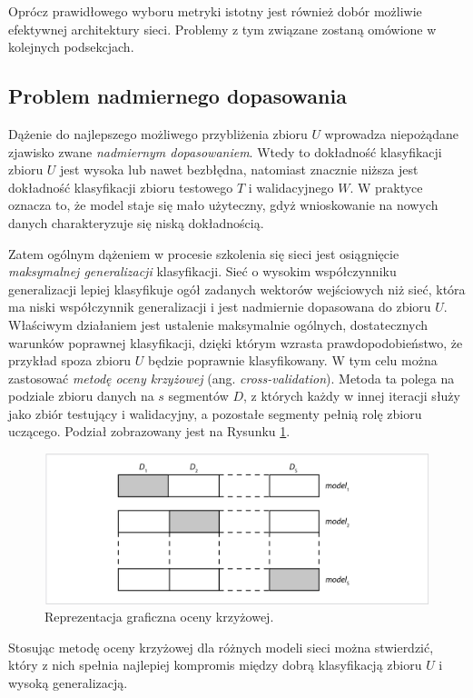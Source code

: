 Oprócz prawidłowego wyboru metryki istotny jest również dobór możliwie efektywnej architektury sieci. Problemy z tym związane zostaną omówione w kolejnych podsekcjach.

\subsection{Problem nadmiernego dopasowania}
\label{sec-overffiting}

Dążenie do najlepszego możliwego przybliżenia zbioru $U$ wprowadza niepożądane zjawisko zwane \textit{nadmiernym dopasowaniem}. Wtedy to dokładność klasyfikacji zbioru $U$ jest wysoka lub nawet bezbłędna, natomiast znacznie niższa jest dokładność klasyfikacji zbioru testowego $T$ i walidacyjnego $W$. W praktyce oznacza to, że model staje się mało użyteczny, gdyż wnioskowanie na nowych danych charakteryzuje się niską dokładnością.

Zatem ogólnym dążeniem w procesie szkolenia się sieci jest osiągnięcie \textit{maksymalnej generalizacji} klasyfikacji. Sieć o wysokim współczynniku generalizacji lepiej klasyfikuje ogół zadanych wektorów wejściowych niż sieć, która ma niski współczynnik generalizacji i jest nadmiernie dopasowana do zbioru $U$. Właściwym działaniem jest ustalenie maksymalnie ogólnych, dostatecznych warunków poprawnej klasyfikacji, dzięki którym wzrasta prawdopodobieństwo, że przykład spoza zbioru $U$ będzie poprawnie klasyfikowany. W tym celu można zastosować \textit{metodę oceny krzyżowej} (ang. \textit{cross-validation}). Metoda ta polega na podziale zbioru danych na $s$ segmentów $D$, z których każdy w innej iteracji służy jako zbiór testujący i walidacyjny, \linebreak a pozostałe segmenty pełnią rolę zbioru uczącego. Podział zobrazowany jest na Rysunku \ref{cross-validation}.
\begin{figure}[h!]
	\centering
	\includegraphics[width=1\textwidth]{figures/cross-validation.png}
	\caption{Reprezentacja graficzna oceny krzyżowej.}
	\label{cross-validation}
\end{figure}
Stosując metodę oceny krzyżowej dla różnych modeli sieci można stwierdzić, który z nich spełnia najlepiej kompromis między dobrą klasyfikacją zbioru $U$ i wysoką generalizacją.

